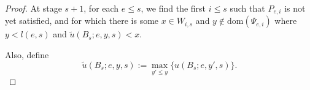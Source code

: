 \documentclass{article}
\begin{document}
\begin{proof}
    At stage $s+1$, for each $e\leq s$, we find the first $i\leq s$ such
    that $P_{e,i}$ is not yet satisfied, and for which there is some $x\in
    W_{i,s}$ and $y\not\in\text{dom}(\Psi_{e,i})$ where $y<l(e,s)$ and
    $\tilde{u}(B_s;e,y,s)<x$.

    Also, define
    \[\tilde{u}(B_s;e,y,s) :=\max_{y'\leq y}\{u(B_s;e,y',s)\}.\]
  \end{proof}
\end{document}
